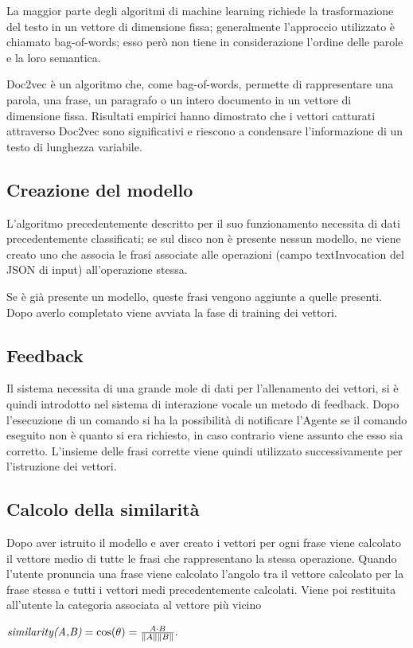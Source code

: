 \documentclass[twoside]{supsistudent}
\begin{document}
La maggior parte degli algoritmi di machine learning richiede la trasformazione del testo in un vettore di dimensione fissa; generalmente l'approccio utilizzato è chiamato bag-of-words; esso però non tiene in considerazione l'ordine delle parole e la loro semantica.\cite{bow}

Doc2vec è un algoritmo che, come bag-of-words, permette di  rappresentare una parola, una frase, un paragrafo o un intero documento in un vettore di dimensione fissa. Risultati empirici hanno dimostrato che i vettori catturati attraverso Doc2vec sono significativi e riescono a condensare l'informazione di un testo di lunghezza variabile.\cite{doc2vec}
\subsection{Creazione del modello}
L'algoritmo precedentemente descritto per il suo funzionamento necessita di dati precedentemente classificati; se sul disco non è presente nessun modello, ne viene creato uno che associa le frasi associate alle operazioni (campo textInvocation del JSON di input) all'operazione stessa. 

Se è già presente un modello, queste frasi vengono aggiunte a quelle presenti. Dopo averlo completato viene avviata la fase di training dei vettori.
\subsection{Feedback}
Il sistema necessita di una grande mole di dati per l'allenamento dei vettori, si è quindi introdotto nel sistema di interazione vocale un metodo di feedback. Dopo l'esecuzione di un comando si ha la possibilità di notificare l'Agente se il comando eseguito non è quanto si era richiesto, in caso contrario viene assunto che esso sia corretto. L'insieme delle frasi corrette viene quindi utilizzato successivamente per l'istruzione dei vettori.
\subsection{Calcolo della similarità}
Dopo aver istruito il modello e aver creato i vettori per ogni frase viene calcolato il vettore medio di tutte le frasi che rappresentano la stessa operazione. Quando l'utente pronuncia una frase viene calcolato l'angolo tra il vettore calcolato per la frase stessa e tutti i vettori medi precedentemente calcolati. Viene poi restituita all'utente la categoria associata al vettore più vicino
\begin{center}
\begin{math}
 \textit{similarity(A,B)} = \cos(\theta) = {A \cdot B \over \|A\| \|B\|}.
 \end{math}
 \end{center}
\end{document}
